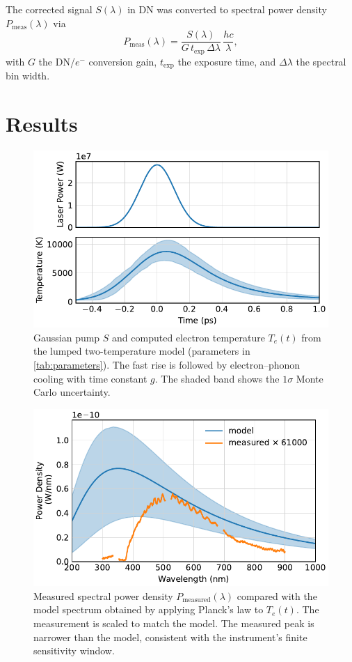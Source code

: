 \documentclass[
	parskip=half,
	a4paper,
]{scrarticle}
\begin{document}
The corrected signal \(S(\lambda)\) in DN was converted to spectral power density \(P_{\text{meas}}(\lambda)\) via
\begin{equation}
  P_{\text{meas}}(\lambda)
  = \frac{S(\lambda)}{G\,t_{\text{exp}}\,\Delta\lambda}\,\frac{hc}{\lambda},
\end{equation}
with \(G\) the DN/\(e^-\) conversion gain, \(t_{\text{exp}}\) the exposure time, and \(\Delta\lambda\) the spectral bin width.  


\section{Results}
\begin{figure}
    \centering
    \includegraphics{../analysis/figures/model te.pdf}
    \caption{Gaussian pump \(S\) and computed electron temperature \(T_e(t)\) from the lumped two-temperature model (parameters in \autoref{tab:parameters}). The fast rise is followed by electron–phonon cooling with time constant \(g\). The shaded band shows the \(1\sigma\) Monte Carlo uncertainty.}
    \label{fig:Te}
\end{figure}
\begin{figure}
    \centering
    \includegraphics{../analysis/figures/spectrum de.pdf}
    \caption{Measured spectral power density \(P_\text{measured}(\lambda)\) compared with the model spectrum obtained by applying Planck’s law to \(T_e(t)\). The measurement is scaled to match the model. The measured peak is narrower than the model, consistent with the instrument’s finite sensitivity window.}
    \label{fig:spectra}
\end{figure}
\end{document}

